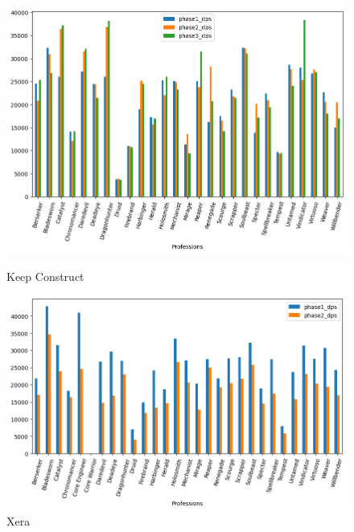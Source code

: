 \documentclass[12pt,a4paper]{article}
\begin{document}
    \begin{figure}[h!]
        
        \centering
        
        \includegraphics[width=1 \linewidth]{kc_dps_plot.png}
        \caption{Keep Construct}
        \includegraphics[width=1 \linewidth]{xera_dps_plot.png}
        \caption{Xera}
    \end{figure}

    \newpage
\end{document}
